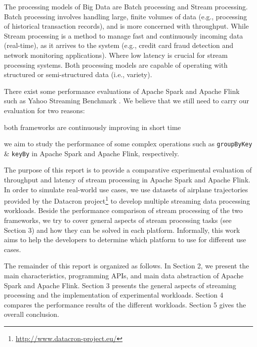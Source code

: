 \documentclass[]{article}
\begin{document}
\par The processing models of Big Data are Batch processing and Stream processing. Batch processing involves handling  large, finite volumes of data (e.g., processing of historical transaction records), and is more concerned with throughput. While Stream processing  is a method to manage fast and continuously incoming data (real-time), as it arrives to the system (e.g., credit card fraud detection and network monitoring applications). Where low latency is crucial for stream processing systems. Both processing models are capable of operating with structured or semi-structured data (i.e., variety).

\par There exist some performance evaluations of Apache Spark and Apache Flink  such as Yahoo Streaming Benchmark \cite{yahoo}. We believe that we still need to carry our evaluation for two reasons: \begin{enumerate*}[label=(\roman*)]
\item both frameworks are continuously improving in short time 
\item we aim to study the performance of some complex operations such as \texttt{groupByKey} \& \texttt{keyBy} in Apache Spark and Apache Flink, respectively.
\end{enumerate*}

 

\par The purpose of this report is to provide a comparative experimental evaluation of throughput and latency of stream processing in Apache Spark and Apache Flink. In order to simulate real-world use cases, we use datasets of airplane trajectories provided by the  Datacron project\footnote{\url{http://www.datacron-project.eu/}} to develop multiple streaming data processing workloads. Beside the performance comparison of stream processing of the two frameworks, we try to cover general aspects of stream processing tasks (see Section 3) and how they can be solved in each platform. Informally,  this work aims to help the developers to determine which platform to use for different use cases. 


\par The remainder of this report is organized as follows.
In Section 2, we present the main characteristics, programming APIs, and main data abstraction of Apache Spark and Apache Flink. Section 3  presents the general aspects of streaming processing and the implementation of experimental workloads. Section 4
compares the performance results of the different workloads. Section 5 gives the overall conclusion.
\end{document}
